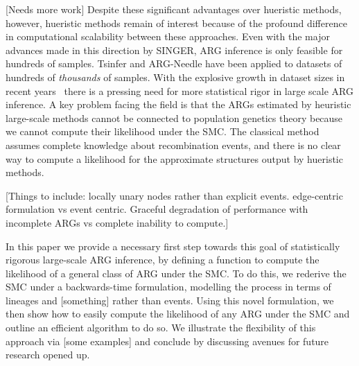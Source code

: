 \documentclass{article}
\begin{document}
[Needs more work]
Despite these significant advantages over hueristic methods, however,
hueristic methods remain of interest because of the profound difference
in computational scalability between these approaches. Even with the 
major advances made in this direction by SINGER, ARG inference is 
only feasible for hundreds of samples. Tsinfer and ARG-Needle have 
been applied to datasets of hundreds of \emph{thousands} of samples.
With the explosive growth in dataset
sizes in recent years~\citep[e.g.][]{bycroft_genome_2018,halldorsson_sequences_2022,
all_genomic_2024} there is a pressing need for more statistical
rigor in large scale ARG inference. 
A key problem facing the field is that the ARGs estimated by heuristic large-scale 
methods cannot be connected to population genetics theory because 
we cannot compute their likelihood under the SMC. The classical 
method~\citep{kuhner_maximum_2000} assumes complete knowledge about
recombination events, and there is no clear way to compute a likelihood for 
the approximate structures output by hueristic methods.

[Things to include: locally unary nodes rather than explicit events.
edge-centric formulation vs event centric. Graceful degradation of
performance with incomplete ARGs vs complete inability to compute.]

In this paper we provide a necessary first step towards this goal
of statistically rigorous large-scale ARG inference, by defining a function
to compute the likelihood of a general class of ARG under the SMC.
To do this, we rederive the SMC under a backwards-time formulation,
modelling the process in terms of lineages and [something] rather
than events. Using this novel formulation, we then show how to 
easily compute the likelihood of any ARG under the SMC and outline 
an efficient algorithm to do so. We illustrate the flexibility of this
approach via [some examples] and conclude by discussing avenues
for future research opened up.

\end{document}
